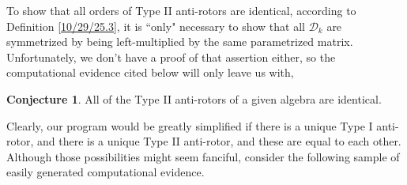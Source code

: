 \documentclass{amsart}
\theoremstyle{definition}
\newtheorem{conjecture}[theorem]{Conjecture}
\numberwithin{theorem}{section}
\numberwithin{equation}{section}
\begin{document}
To show that all orders of Type II anti-rotors are identical, according to Definition \ref{10/29/25.3}, it is ``only" necessary to show that all $\mathcal{D}_k$ are symmetrized by being left-multiplied by the same parametrized matrix.  Unfortunately, we don't have a proof of that assertion either, so the computational evidence cited below will only leave us with,

\begin{conjecture}\label{10/30/25.6} All of the Type II anti-rotors of a given algebra are identical. \end{conjecture}

 Clearly, our program would be greatly simplified if there is a unique Type I anti-rotor, and there is a unique Type II anti-rotor, and these are equal to each other.  Although those possibilities might seem fanciful, consider the following sample of easily generated computational evidence.  
\end{document}
